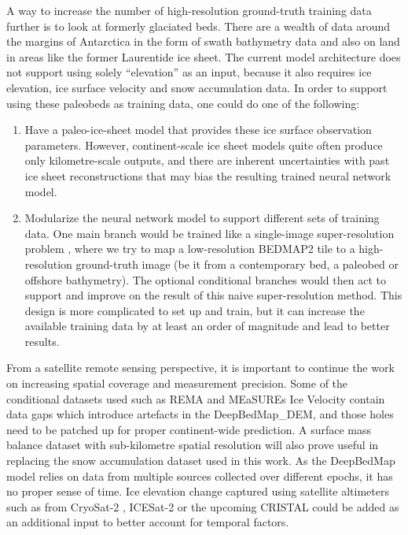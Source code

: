 \documentclass[tc, noline]{copernicus}
\begin{document}
A way to increase the number of high-resolution ground-truth training data further is to look at formerly glaciated beds. There are a wealth of data
around the margins of Antarctica in the form of swath bathymetry data and also on land in areas like the former Laurentide ice sheet. The current
model architecture does not support using solely ``elevation'' as an input, because it also requires ice elevation, ice surface velocity and snow
accumulation data. In order to support using these paleobeds as training data, one could do one of the following:
\begin{enumerate}
\item Have a paleo-ice-sheet model that provides these ice surface observation parameters. However, continent-scale ice sheet models quite often
  produce only kilometre-scale outputs, and there are inherent uncertainties with past ice sheet reconstructions that may bias the resulting trained
  neural network model.

\item Modularize the neural network model to support different sets of training data. One main branch would be trained like a single-image super-resolution problem \citep{YangDeepLearningSingle2019}, where we try to map a low-resolution BEDMAP2 tile to a high-resolution ground-truth image (be
  it from a contemporary bed, a paleobed or offshore bathymetry). The optional conditional branches would then act to support and improve on the result of this naive super-resolution method. This design is more complicated to set up and train, but it can increase the available training data by at least an order of magnitude and lead to better results.
\end{enumerate}
From a satellite remote sensing perspective, it is important to continue the work on increasing spatial coverage and measurement precision. Some of
the conditional datasets used such as REMA \citep{HowatReferenceElevationModel2019} and MEaSUREs Ice Velocity \citep{MouginotMEaSUREsPhaseMap2019}
contain data gaps which introduce artefacts in the DeepBedMap\_DEM, and those holes need to be patched up for proper continent-wide prediction. A surface mass balance dataset with sub-kilometre spatial resolution will also prove useful in replacing the snow accumulation dataset
\citep{ArthernAntarcticsnowaccumulation2006} used in this work. As the DeepBedMap model relies on data from multiple sources collected over different
epochs, it has no proper sense of time. Ice elevation change captured using satellite altimeters such as from CryoSat-2
\citep{HelmElevationelevationchange2014}, ICESat-2 \citep{MarkusIceCloudland2017} or the upcoming CRISTAL \citep{KernCopernicusPolarIce2020} could be
added as an additional input to better account for temporal factors.
\end{document}
